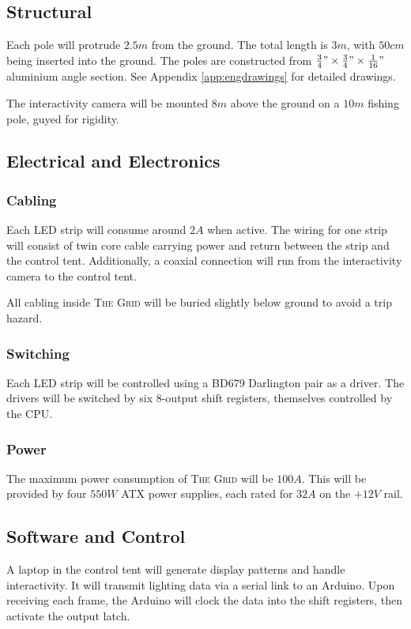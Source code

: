 \documentclass[12pt]{article} %
\begin{document}
\subsection{Structural}
Each pole will protrude $2.5m$ from the ground.  The total length is $3m$, with $50cm$ being inserted into the ground.  The poles are constructed from $\frac{3}{4}" \times \frac{3}{4}" \times \frac{1}{16}"$ aluminium angle section.  See Appendix \ref{app:engdrawings} for detailed drawings.

The interactivity camera will be mounted $8m$ above the ground on a $10m$ fishing pole, guyed for rigidity.

\subsection{Electrical and Electronics}
\subsubsection{Cabling}
Each LED strip will consume around $2A$ when active.  The wiring for one strip will consist of twin core cable carrying power and return between the strip and the control tent.  Additionally, a coaxial connection will run from the interactivity camera to the control tent.

All cabling inside \textsc{The Grid} will be buried slightly below ground to avoid a trip hazard.

\subsubsection{Switching}
Each LED strip will be controlled using a BD679 Darlington pair as a driver.  The drivers will be switched by six 8-output shift registers, themselves controlled by the CPU.

\subsubsection{Power}
The maximum power consumption of \textsc{The Grid} will be $100A$.  This will be provided by four $550W$ ATX power supplies, each rated for $32A$ on the $+12V$ rail.

\subsection{Software and Control}
A laptop in the control tent will generate display patterns and handle interactivity.  It will transmit lighting data via a serial link to an Arduino.  Upon receiving each frame, the Arduino will clock the data into the shift registers, then activate the output latch.
\end{document}
